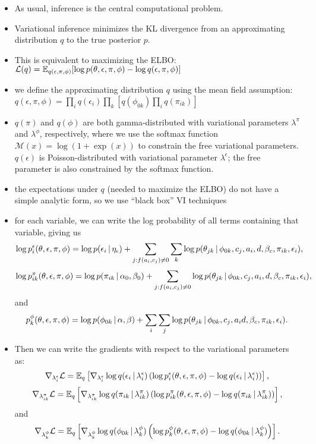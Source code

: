 \begin{itemize}
\item As usual, inference is the central computational problem.
\item Variational inference minimizes the KL divergence from an approximating distribution $q$ to the true posterior $p$.
\item This is equivalent to maximizing the ELBO: $\mathcal{L}(q)  = \mathbb{E}_{q(\epsilon, \pi, \phi)}[\log p(\theta,\epsilon,\pi,\phi) - \log q(\epsilon, \pi, \phi)]$
\item we define the approximating distribution $q$ using the mean field assumption: $q(\epsilon, \pi, \phi) = \prod_i q(\epsilon_{i})\prod_k\left[q(\phi_{0k})\prod_i q(\pi_{ik})\right]$ 
\item $q(\pi)$ and $q(\phi)$ are both gamma-distributed with variational parameters $\lambda^\pi$ and $\lambda^\phi$, respectively, where we use the softmax function $\mathcal{M}(x) = \log(1+\exp(x))$ to constrain the free variational parameters.
$q(\epsilon)$ is Poisson-distributed with variational parameter $\lambda^\epsilon$; the free parameter is also constrained by the softmax function.

\item the expectations under $q$ (needed to maximize the ELBO) do not have a simple analytic form, so we use ``black box'' VI techniques
\item for each variable, we can write the log probability of all terms containing that variable, giving us 
\[\log p^\epsilon_{i}(\theta, \epsilon, \pi, \phi) = \log p(\epsilon_{i} \, | \, \eta_\epsilon) + \sum_{j : f(a_i, c_j) \neq 0}\sum_k\log p(\theta_{jk} \, | \, \phi_{0k}, c_j, a_i, d, \beta_c, \pi_{ik}, \epsilon_i),\]
\[\log p^\pi_{ik}(\theta, \epsilon, \pi, \phi) = \log p(\pi_{ik} \, | \, \alpha_0, \beta_0) + \sum_{j : f(a_i, c_j) \neq 0}\log p(\theta_{jk} \, | \, \phi_{0k}, c_j, a_i, d, \beta_c, \pi_{ik}, \epsilon_i),\]
and
\[p^\phi_{k}(\theta, \epsilon, \pi, \phi) = \log p(\phi_{0k} \, | \, \alpha, \beta) + \sum_i\sum_{j} \log p(\theta_{jk} \, | \, \phi_{0k}, c_j, a_i d, \beta_c, \pi_{ik}, \epsilon_i).\]
\item Then we can write the gradients with respect to the variational parameters as:
\[\nabla_{\lambda^\epsilon_{i}} \mathcal{L} = \mathbb{E}_q \left[ \nabla_{\lambda^\epsilon_{i}} \log q(\epsilon_{i} \, | \, \lambda^\epsilon_{i}) \left( \log p^\epsilon_{i}(\theta, \epsilon, \pi, \phi) - \log q(\epsilon_{i} \, | \, \lambda^\epsilon_{i}) \right)\right],\]
\[\nabla_{\lambda^\pi_{ik}} \mathcal{L} = \mathbb{E}_q \left[ \nabla_{\lambda^\pi_{ik}} \log q(\pi_{ik} \, | \, \lambda^\pi_{ik}) \left( \log p^\pi_{ik}(\theta, \epsilon, \pi, \phi) - \log q(\pi_{ik} \, | \, \lambda^\pi_{ik}) \right)\right],\]
and
\[\nabla_{\lambda^\phi_{k}} \mathcal{L} = \mathbb{E}_q \left[ \nabla_{\lambda^\phi_{k}} \log q(\phi_{0k} \, | \, \lambda^\phi_{k}) \left( \log p^\phi_{k}(\theta, \epsilon, \pi, \phi) - \log q(\phi_{0k} \, | \, \lambda^\phi_{k}) \right)\right].\]
\end{itemize}

